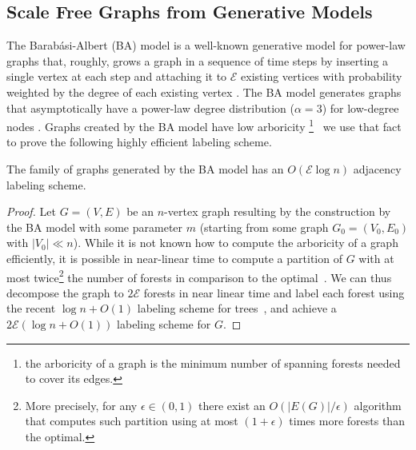 \subsection{Scale Free  Graphs from Generative Models}\label{Sec:ScaleFree}
The Barab{\'a}si-Albert (BA) model is a well-known generative model for power-law graphs that, roughly, grows a graph in a sequence of time steps by
inserting a single vertex at each step and attaching it to $\mathcal{E}$ existing vertices with probability weighted by the degree of each existing vertex \cite{barabasi1999emergence}. The BA model
generates graphs that asymptotically have a power-law degree distribution ($\alpha = 3$) for low-degree nodes \cite{DBLP:journals/rsa/BollobasRST01}.
Graphs created by the BA model have low arboricity \footnote{the arboricity of a graph is the minimum number of spanning forests needed to cover its edges.}~\cite{goel2006bounded} we use
that fact to prove the following highly efficient labeling scheme. 

\begin{proposition}\label{Th:baLabeling}
The family of graphs generated by the BA model has an $O(\mathcal{E} \log n)$ adjacency labeling scheme.
\end{proposition}

\begin{proof}
Let  $G=(V,E)$  be an $n$-vertex graph resulting by the construction  by the BA model with some parameter $m$ (starting from some graph $G_0 = (V_0,E_0)$ with $\vert V_0 \vert \ll n$).
While it is not known how to compute the   arboricity of a graph efficiently, it is possible in near-linear time to compute a partition of $G$ with  at most twice\footnote{More precisely, for any $\epsilon \in (0,1)$  there exist an $O(|E(G)| / \epsilon)$ algorithm~\cite{kowalik2006approximation} that computes such partition using at most $(1+ \epsilon)$ times more forests than the optimal.} the number of forests in comparison to the optimal~\cite{arikati1997efficient}.
We can thus decompose the graph to $2\mathcal{E}$ forests in near linear time and label each forest using the recent $\log n + O(1)$ labeling scheme for trees~\cite{alstrup2015optimal},  and achieve a $2\mathcal{E} (\log n+O(1))$ labeling scheme for $G$.
\end{proof}

